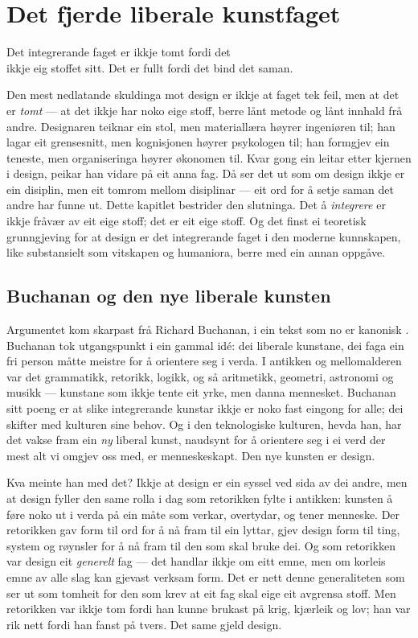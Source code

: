 \chapter{Det fjerde liberale kunstfaget}

\begin{motto}
Det integrerande faget er ikkje tomt fordi det\\ ikkje eig stoffet sitt. Det er fullt fordi det bind det saman.
\end{motto}

Den mest nedlatande skuldinga mot design er ikkje at faget tek feil, men at det er \emph{tomt} — at det ikkje har noko eige stoff, berre lånt metode og lånt innhald frå andre. Designaren teiknar ein stol, men materiallæra høyrer ingeniøren til; han lagar eit grensesnitt, men kognisjonen høyrer psykologen til; han formgjev ein teneste, men organiseringa høyrer økonomen til. Kvar gong ein leitar etter kjernen i design, peikar han vidare på eit anna fag. Då ser det ut som om design ikkje er ein disiplin, men eit tomrom mellom disiplinar — eit ord for å setje saman det andre har funne ut. Dette kapitlet bestrider den slutninga. Det å \emph{integrere} er ikkje fråvær av eit eige stoff; det er eit eige stoff. Og det finst ei teoretisk grunngjeving for at design er det integrerande faget i den moderne kunnskapen, like substansielt som vitskapen og humaniora, berre med ein annan oppgåve.

\section{Buchanan og den nye liberale kunsten}

Argumentet kom skarpast frå Richard Buchanan, i ein tekst som no er kanonisk \autocite{buchanan1992wicked}. Buchanan tok utgangspunkt i ein gammal idé: dei liberale kunstane, dei faga ein fri person måtte meistre for å orientere seg i verda. I antikken og mellomalderen var det grammatikk, retorikk, logikk, og så aritmetikk, geometri, astronomi og musikk — kunstane som ikkje tente eit yrke, men danna mennesket. Buchanan sitt poeng er at slike integrerande kunstar ikkje er noko fast eingong for alle; dei skifter med kulturen sine behov. Og i den teknologiske kulturen, hevda han, har det vakse fram ein \emph{ny} liberal kunst, naudsynt for å orientere seg i ei verd der mest alt vi omgjev oss med, er menneskeskapt. Den nye kunsten er design.

Kva meinte han med det? Ikkje at design er ein syssel ved sida av dei andre, men at design fyller den same rolla i dag som retorikken fylte i antikken: kunsten å føre noko ut i verda på ein måte som verkar, overtydar, og tener menneske. Der retorikken gav form til ord for å nå fram til ein lyttar, gjev design form til ting, system og røynsler for å nå fram til den som skal bruke dei. Og som retorikken var design eit \emph{generelt} fag — det handlar ikkje om eitt emne, men om korleis emne av alle slag kan gjevast verksam form. Det er nett denne generaliteten som ser ut som tomheit for den som krev at eit fag skal eige eit avgrensa stoff. Men retorikken var ikkje tom fordi han kunne brukast på krig, kjærleik og lov; han var rik nett fordi han fanst på tvers. Det same gjeld design.

